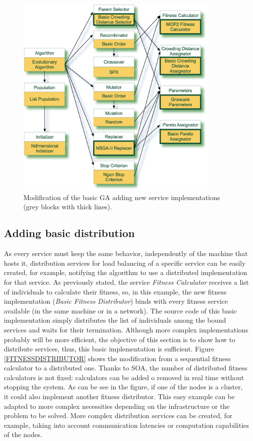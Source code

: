 \begin{figure}
\centering
\includegraphics[width=10cm]{gfx/soaea/nsga2.jpg}
\caption{Modification of the basic GA adding new service implementations (grey blocks with thick lines).}
\label{fig:nsga2}
\end{figure}



\subsection{Adding basic distribution}
\label{sec:distribution}

As every service must keep the same behavior, independently of the machine that hosts it, distribution services for load balancing of a specific service can be easily created, for example, notifying the algorithm to use a distributed implementation for that service. As previously stated, the service {\em Fitness Calculator} receives a list of individuals to calculate their fitness, so, in this example, the new fitness implementation ({\em Basic Fitness Distributor}) binds with every fitness service available (in the same machine or in a network). The source code of this basic implementation simply distributes the list of individuals among the bound services and waits for their termination. Although more complex implementations probably will be more efficient, the objective of this section is to show how to distribute services, thus, this basic implementation is sufficient. Figure \ref{FITNESSDISTRIBUTOR} shows the modification from a sequential fitness calculator to a distributed one. Thanks to SOA, the number of distributed fitness calculators is not fixed: calculators can be added o removed in real time without stopping the system. As can be see in the figure, if one of the nodes is a cluster, it could also  implement another fitness distributor. This easy example can be adapted to more complex necessities depending on the infrastructure or the problem to be solved. More complex distribution services can be created, for example, taking into account communication latencies or computation capabilities of the nodes.




